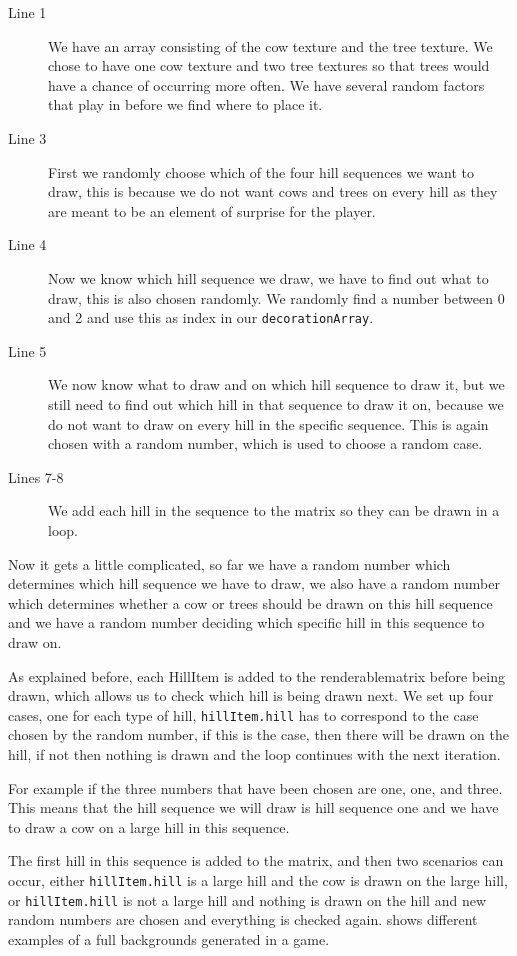 \begin{description}
\item[Line 1] We have an array consisting of the cow texture and the tree texture. We chose to have one cow texture and two tree textures so that trees would have a chance of occurring more often. We have several random factors that play in before we find where to place it. 
\item[Line 3] First we randomly choose which of the four hill sequences we want to draw, this is because we do not want cows and trees on every hill as they are meant to be an element of surprise for the player. 
\item[Line 4] Now we know which hill sequence we draw, we have to find out what to draw, this is also chosen randomly. We randomly find a number between 0 and 2 and use this as index in our \lstinline|decorationArray|.
\item[Line 5] We now know what to draw and on which hill sequence to draw it, but we still need to find out which hill in that sequence to draw it on, because we do not want to draw on every hill in the specific sequence. This is again chosen with a random number, which is used to choose a random case. 
\item[Lines 7-8] We add each hill in the sequence to the matrix so they can be drawn in a loop. 
\end{description}

Now it gets a little complicated, so far we have a random number which determines which hill sequence we have to draw, we also have a random number which determines whether a cow or trees should be drawn on this hill sequence and we have a random number deciding which specific hill in this sequence to draw on. 

As explained before, each HillItem is added to the renderablematrix before being drawn, which allows us to check which hill is being drawn next. We set up four cases, one for each type of hill, \lstinline|hillItem.hill| has to correspond to the case chosen by the random number, if this is the case, then there will be drawn on the hill, if not then nothing is drawn and the loop continues with the next iteration.  

For example if the three numbers that have been chosen are one, one, and three. This means that the hill sequence we will draw is hill sequence one and we have to draw a cow on a large hill in this sequence. 

The first hill in this sequence is added to the matrix, and then two scenarios can occur, either \lstinline|hillItem.hill| is a large hill and the cow is drawn on the large hill, or \lstinline|hillItem.hill| is not a large hill and nothing is drawn on the hill and new random numbers are chosen and everything is checked again.  shows different examples of a full backgrounds generated in a game.

